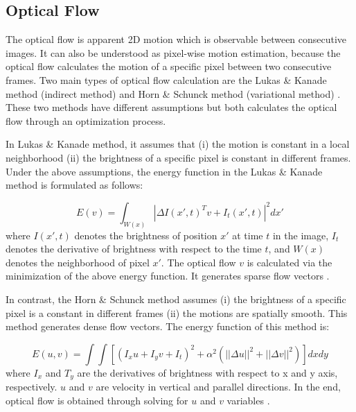 \documentclass[11pt]{easychair}
\begin{document}

\subsection{Optical Flow} The optical flow is apparent 2D motion which is observable between consecutive images. It can also be understood as pixel-wise motion estimation, because the optical flow calculates the motion of a specific pixel between two consecutive frames. Two main types of optical flow calculation are the Lukas \& Kanade method (indirect method) and Horn \& Schunck method (variational method) \cite{lukas} \cite{horn}. These two methods have different assumptions but both calculates the optical flow through an optimization process.

In Lukas \& Kanade method, it assumes that (i) the motion is constant in a local neighborhood (ii) the brightness of a specific pixel is constant in different frames. Under the above assumptions, the energy function in the Lukas \& Kanade method is formulated as follows:

\begin{equation}
E(v) = \int_{W(x)} |\Delta I(x', t)^Tv + I_t(x',t) |^2dx'
\end{equation}
\noindent
where $I(x',t)$ denotes the brightness of position $x'$ at time $t$ in the image, $I_t$ denotes the derivative of brightness with respect to the time $t$, and $W(x)$ denotes the neighborhood of pixel $x'$. The optical flow $v$ is calculated via the minimization of the above energy function. It generates sparse flow vectors \cite{lukas}.

In contrast, the Horn \& Schunck method assumes (i) the brightness of a specific pixel is a constant in different frames (ii) the motions are spatially smooth. This method generates dense flow vectors. The energy function of this method is:

\begin{equation}
E(u,v) = \int\int[(I_xu + I_yv + I_t)^2+\alpha^2(||\Delta u ||^2 + ||\Delta v ||^2)]dxdy
\end{equation} 
\noindent
where $I_x$ and $T_y$ are the derivatives of brightness with respect to x and y axis, respectively. $u$ and $v$ are velocity in vertical and parallel directions. In the end, optical flow is obtained through solving for $u$ and $v$ variables \cite{horn}.		
\end{document}
